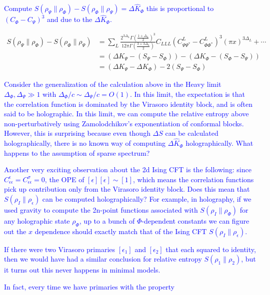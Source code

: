 \documentclass[11pt]{article}
\newcommand{\ep}{\epsilon}
\newcommand{\lb}{\left(}
\newcommand{\rb}{\right)}
\newcommand{\NL}[1]{\textcolor{blue}{#1}}
\begin{document}
\NL{Compute $S(\rho_\Psi\|\rho_\Phi)-S(\rho_\Phi\|\rho_\Psi)=\Delta \hat{K}_\Phi$ this is proportional to $(C_\Phi-C_\Psi)^3$ and due to the $\Delta \hat{K}_\Phi$.}

\begin{align}
    S(\rho_\Psi \|\rho_\Phi) -S(\rho_\Phi \|\rho_\Psi)   
    &=\sum_L \frac{2^{3\Delta_L}\Gamma \lb\frac{1+\Delta_L}{2}\rb^3}{12\pi \Gamma\lb\frac{3+3\Delta_L}{2}\rb}C_{LLL}(C^L_{\Psi\Psi^*} - C^L_{\Phi\Phi^*})^3(\pi x)^{3\Delta_L} +\cdots \\
    &=\lb \Delta K_\Psi - (S_\Psi - S_\Phi) \rb - \lb \Delta K_\Phi - (S_\Phi - S_\Psi) \rb
    \\
    &= \lb \Delta K_\Psi - \Delta K_\Phi \rb -2 \lb S_\Psi - S_\Phi\rb
\end{align}


\NL{Consider the generalization of the calculation above in the Heavy limit $\Delta_\Phi, \Delta_\Psi\gg 1$ with $\Delta_\Phi/c\sim \Delta_\Psi/c=O(1)$. In this limit, the expectation is that the correlation function is dominated by the Virasoro identity block, and is often said to be holographic. In this limit, we can compute the relative entropy above non-perturbatively using Zamolodchikov's exponentiation of conformal blocks. However, this is surprising because even though $\Delta S$ can be calculated holographically, there is no known way of computing $\Delta \hat{K}_\Phi$ holographically. What happens to the assumption of sparse spectrum?}


\NL{Another very exciting observation about the 2d Ising CFT is the following: since $C_{\ep\ep}^\ep=C^\sigma_{\ep\ep}=0$, the OPE of $[\ep][\ep]\sim [1]$, which means the correlation functions pick up contribution only from the Virasoro identity block. Does this mean that $S(\rho_I\|\rho_\ep)$ can be computed holographically? For example, in holography, if we used gravity to compute the 2n-point functions associated with $S(\rho_I\|\rho_\Phi)$ for any holographic state $\rho_\Phi$, up to a bunch of $\Phi$-dependent constants we can figure out the $x$ dependence should exactly match that of the Ising CFT $S(\rho_I\|\rho_\ep)$.}

\NL{If there were two Virasoro primaries $[\ep_1]$ and $[\ep_2]$ that each squared to identity, then we would have had a similar conclusion for relative entropy $S(\rho_1\|\rho_2)$, but it turns out this never happens in minimal models.}

\NL{In fact, every time we have primaries with the property }
\end{document}
